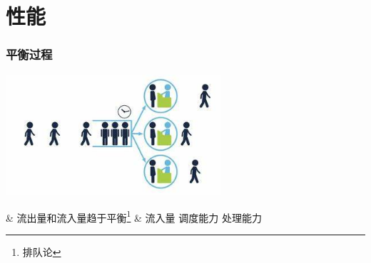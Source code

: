 \documentclass[UTF8,8pt,xcolor=dvipsnames]{beamer}
\newenvironment{myeasylist}[1]{
    \Activate
    \begin{tcolorbox}
    \begin{easylist}[#1]
} {
    \end{easylist}
    \end{tcolorbox}
    \Deactivate
}
\begin{document}
\section{性能}

\begin{frame}[fragile]
    \frametitle{平衡过程}
    \begin{center}
        \includegraphics[width=0.6\textwidth]{../imgs/queuing.jpeg}
    \end{center}

    \begin{myeasylist}{itemize}
        & 流出量和流入量趋于平衡\footnote{排队论}
        & 流入量  调度能力  处理能力
    \end{myeasylist}
\end{frame}
\end{document}
